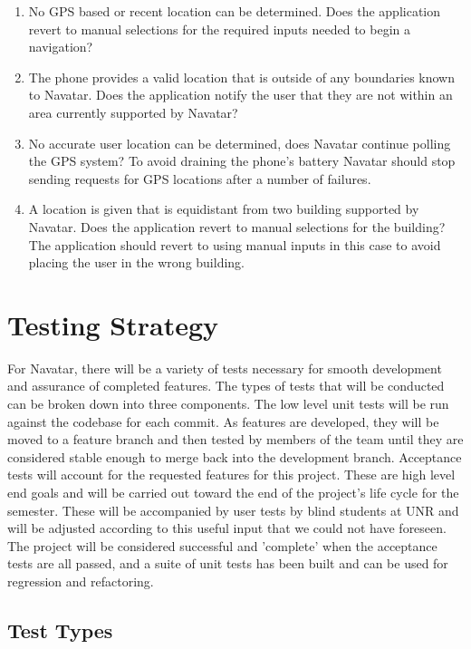 \documentclass{scrreprt}
\begin{document}
\begin{enumerate}
	\item No GPS based or recent location can be determined. Does the application revert to manual selections for the required inputs needed to begin a navigation?
	
	\item The phone provides a valid location that is outside of any boundaries known to Navatar. Does the application notify the user that they are not within an area currently supported by Navatar?
	
	\item No accurate user location can be determined, does Navatar continue polling the GPS system? To avoid draining the phone’s battery Navatar should stop sending requests for GPS locations after a number of failures.
	
	\item A location is given that is equidistant from two building supported by Navatar. Does the application revert to manual selections for the building? The application should revert to using manual inputs in this case to avoid placing the user in the wrong building.

\end{enumerate}

\chapter{Testing Strategy}

For Navatar, there will be a variety of tests necessary for smooth development and assurance of completed features. The types of tests that will be conducted can be broken down into three components. The low level unit tests will be run against the codebase for each commit. As features are developed, they will be moved to a feature branch and then tested by members of the team until they are considered stable enough to merge back into the development branch.	Acceptance tests will account for the requested features for this project. These are high level end goals and will be carried out toward the end of the project's life cycle for the semester. These will be accompanied by user tests by blind students at UNR and will be adjusted according to this useful input that we could not have foreseen. The project will be considered successful and 'complete' when the acceptance tests are all passed, and a suite of unit tests has been built and can be used for regression and refactoring.

\section{Test Types}
\end{document}
